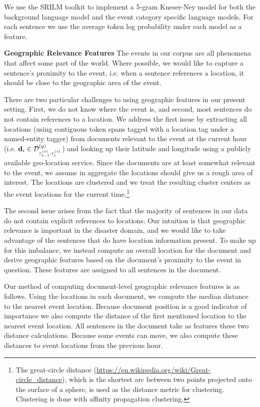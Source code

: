We use the SRILM toolkit \citep{stolcke2002srilm} to implement a 5-gram
Kneser-Ney model for both the background language model and the event category
specific language models. For each sentence we use the average token log
probability under each model as a feature.

\textbf{Geographic Relevance Features}
The events in our corpus are all phenomena that affect some part of the 
world. Where possible, we would like to capture a sentence's proximity to the 
event, i.e. when a sentence references a location, it should be close to the 
geographic area of the event.

There are two particular challenges to using geographic features in our
present setting. First, we do not know where the event is, and second, most
sentences do not contain references to a location. We address the first issue
by extracting all locations (using contiguous token spans tagged with a location tag under a named-entity tagger) from documents relevant to the event at the
current hour (i.e. $\mathbf{d}_i \in \mathcal{D}^{(q)}_{\tau^{(s)}_{t-1}:\tau^{(s)}_t}$) and looking up their latitude and longitude using a publicly
available geo-location service.  Since the documents are at least
somewhat relevant to the event, we assume in aggregate the locations should
give us a rough area of interest.  The locations are clustered and we treat
the resulting cluster centers as the event locations for the current time.\footnote{The great-circle distance (\url{https://en.wikipedia.org/wiki/Great-circle_distance}), which is the shortest arc between two points projected onto the surface of a sphere, is used as the distance metric
for clustering. Clustering is done with affinity propagation clustering.}

The second issue arises from the fact that the majority of sentences in our 
data do not contain explicit references to locations.
Our intuition is that geographic 
relevance is important in the disaster domain, and we would like to take 
advantage of the sentences that do have location information present. To make 
up for this imbalance, we instead compute an overall location for the document
and derive geographic features based on the document's proximity to the event
in question. These features are assigned to all sentences in the document.


Our method of computing document-level geographic relevance features is as 
follows. Using the locations in each document, we compute the median distance 
to the nearest event location. Because document position is a good indicator 
of importance we also compute the distance of the first mentioned location to 
the nearest event location. All sentences in the document take as features 
these two distance calculations. Because some events can move, we also compute
these distances to event locations from the previous hour.


